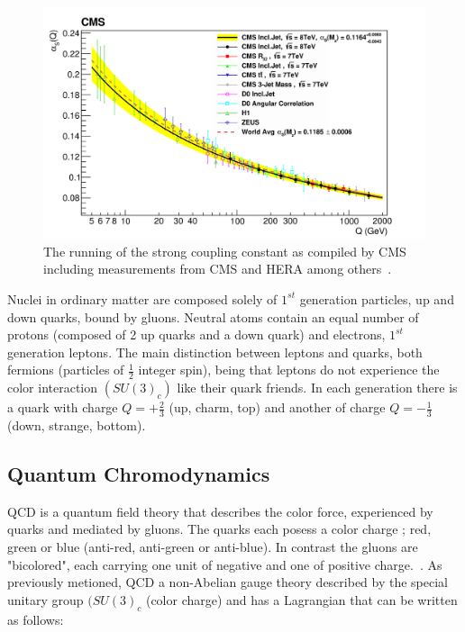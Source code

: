 \begin{figure}[htb]
\centering
\includegraphics[width=.70\textwidth]{visuals/strong-coupling-cms2.png}
\caption{The running of the strong coupling constant as compiled by CMS including measurements from CMS and HERA among others~\cite{CMS:2014mna}.}
\label{fig:alphas}
\end{figure}












Nuclei in ordinary matter are composed solely of $1^{st}$ generation particles, up and down quarks, bound by gluons. Neutral atoms contain an equal number of protons (composed of 2 up quarks and a down quark) and electrons, $1^{st}$ generation leptons. The main distinction between leptons and quarks, both fermions (particles of $\frac{1}{2}$ integer spin), being that leptons do not experience the color interaction $(SU(3)_c)$ like their quark friends. In each generation there is a quark with charge $Q = + \frac{2}{3}$ (up, charm, top) and another of charge $Q = - \frac{1}{3}$ (down, strange, bottom).





\subsection{Quantum Chromodynamics}\label{secQCD}


QCD is a quantum field theory that describes the color force, experienced by quarks and mediated by gluons. The quarks each posess a color charge ; red, green or blue (anti-red, anti-green or anti-blue). In contrast the gluons are "bicolored", each carrying one unit of negative and one of positive charge.~\cite{Griffiths:111880}. As previously metioned, QCD a non-Abelian gauge theory described by the special unitary group $(SU(3)_c$ (color charge) and has a Lagrangian that can be written as follows:\newline


